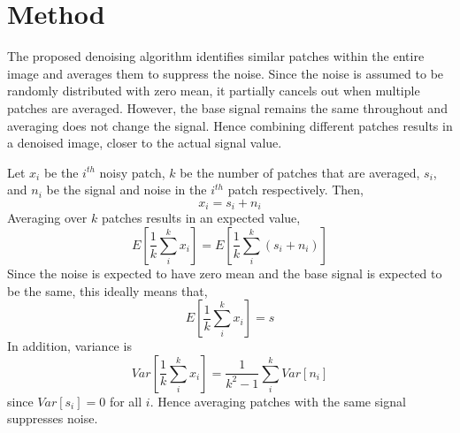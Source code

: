 \documentclass[fleqn,10pt]{wlscirep}
\begin{document}
	
	\section*{Method}
	
	The proposed denoising algorithm identifies similar patches within the entire image and averages them to suppress the noise. Since the noise is assumed to be randomly distributed with zero mean, it partially cancels out when multiple patches are averaged. However, the base signal remains the same throughout and averaging does not change the signal. Hence combining different patches results in a denoised image, closer to the actual signal value. 
	
	Let $x_{i}$ be the $i^{th}$ noisy patch, $k$ be the number of patches that are averaged, $s_i$, and $n_i$ be the signal and noise in the $i^{th}$ patch respectively. Then,
	\begin{equation}
		x_i = s_i + n_i
	\end{equation}
	Averaging over $k$ patches results in an expected value,
	\begin{equation}
		E\left[\frac{1}{k}\sum_{i}^{k}x_i \right] = E\left[\frac{1}{k}\sum_{i}^{k}(s_i + n_i) \right]
	\end{equation}
	Since the noise is expected to have zero mean and the base signal is expected to be the same, this ideally means that,
	\begin{equation}
		E\left[\frac{1}{k}\sum_{i}^{k}x_i \right] = s
	\end{equation}
	In addition, variance is 
	\begin{equation}
		Var\left[\frac{1}{k}\sum_{i}^{k}x_i \right] = \frac{1}{k^2 -1} \sum_{i}^{k}Var\left[n_i\right]
	\end{equation}
	since $Var[s_i] = 0$ for all $i$. Hence averaging patches with the same signal suppresses noise.
	

	
	
	
\end{document}
